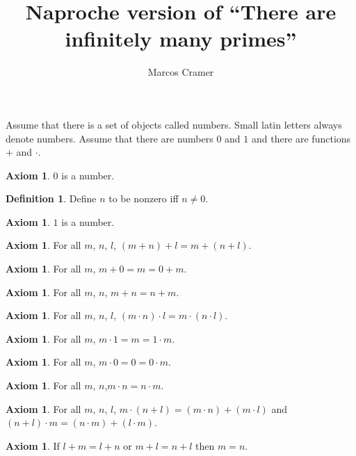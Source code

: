 \documentclass[a4paper,10pt]{article}
\title{Naproche version of ``There are infinitely many primes''}
\author{Marcos Cramer}
\theoremstyle{plain}
\theoremstyle{definition}
\newtheorem{definition}[theorem]{Definition}
\newtheorem{axiom}[theorem]{Axiom}
\begin{document}
\maketitle

Assume that there is a set of objects called numbers.
Small latin letters always denote numbers.
Assume that there are numbers $0$ and $1$ and there are functions $+$ and $\cdot$.

\begin{axiom}
$0$ is a number.
\end{axiom}

\begin{definition}
Define $n$ to be nonzero iff $n \neq 0$.
\end{definition}

\begin{axiom}
$1$ is a number.
\end{axiom}

\begin{axiom} 
For all $m$, $n$, $l$, $(m + n) + l = m + (n + l)$.
\end{axiom}

\begin{axiom} 
For all $m$, $m + 0 = m = 0 + m$.
\end{axiom}

\begin{axiom} 
For all $m$, $n$, $m + n = n + m$. 
\end{axiom}

\begin{axiom} 
For all $m$, $n$, $l$, $(m \cdot n) \cdot l = m \cdot (n \cdot l)$.
\end{axiom}

\begin{axiom} 
For all $m$, $m \cdot 1 = m = 1 \cdot m$.
\end{axiom}

\begin{axiom} 
For all $m$, $m \cdot 0 = 0 = 0 \cdot m$.
\end{axiom}

\begin{axiom} 
For all $m$, $n$,$m \cdot n = n \cdot m$.
\end{axiom}

\begin{axiom}
For all $m$, $n$, $l$, $m \cdot (n + l) = (m \cdot n) + (m \cdot l)$ and $(n + l) \cdot m = (n \cdot m) + (l \cdot m)$.
\end{axiom}

\begin{axiom} 
If $l + m = l + n$ or $m + l = n + l$ then $m = n$.
\end{axiom}
\end{document}

